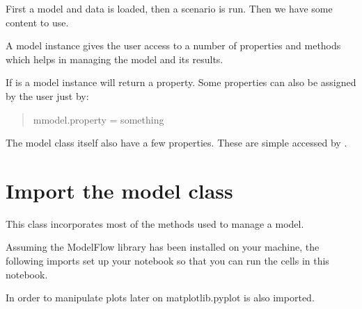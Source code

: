 \documentclass[letterpaper,10pt,english]{jupyterBook}
\begin{document}
\sphinxAtStartPar
First a model and data is loaded, then a scenario is run. Then we have some content to use.

\sphinxAtStartPar
A model instance gives the user access to a number of properties and methods which helps in managing the model and its results.

\sphinxAtStartPar
If  is a model instance  will return a property. Some properties can also be assigned by the user just by:
\begin{quote}

\sphinxAtStartPar
mmodel.property = something
\end{quote}

\sphinxAtStartPar
The model class itself also have a few properties. These are simple accessed by  .


\section{Import the model class}
\label{\detokenize{content/Python/modelflow_features:import-the-model-class}}
\sphinxAtStartPar
This class incorporates most of the methods used to manage a model.

\sphinxAtStartPar
Assuming the ModelFlow library has been installed on your machine, the following imports set up your notebook so that you can run the cells in this notebook.

\sphinxAtStartPar
In order to manipulate plots later on matplotlib.pyplot is also imported.
\end{document}
